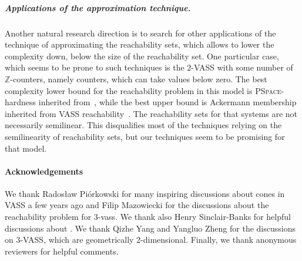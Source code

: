 \documentclass[a4paper, UKenglish, cleveref, autoref, thm-restate]{lipics-v2021}
\newcommand{\Z}{\mathbb{Z}}
\newcommand{\pspace}{\textsc{PSpace}\xspace}
\newcommand{\vass}{{\sc vass}\xspace}
\newcommand{\tvass}{\parvass 3}
\newcommand{\parvass}[1]{{$#1$-\vass}\xspace}
\newcommand{\para}[1]{\vspace{-3mm}\subparagraph*{\bf #1.}}
\begin{document}
\para{Applications of the approximation technique}
Another natural research direction is to search for other applications of the technique of approximating the reachability sets,
which allows to lower the complexity down, below the size of the reachability set.
One particular case, which seems to be prone to such techniques is the $2$-VASS with some number of $\Z$-counters, namely counters, which can take values below zero.
The best complexity lower bound for the reachability problem in this model is \pspace-hardness inherited from~\cite{BlondinFGHM15},
while the best upper bound is Ackermann membership inherited from VASS reachability~\cite{LS19}.
The reachability sets for that systems are not necessarily semilinear.
This disqualifies most of the techniques relying on the semilinearity of reachability sets, but our techniques
seem to be promising for that model.


 


\paragraph*{Acknowledgements}
We thank Radosław Piórkowski for many inspiring discussions about cones in VASS a few years ago
and Filip Mazowiecki for the discussions about the reachability problem for \tvass.
We thank also Henry Sinclair-Banks for helpful discussions about \cite[Thm 4.16]{DBLP:conf/focs/0001CMOSW24}.
We thank Qizhe Yang and Yangluo Zheng for the discussions on $3$-VASS, which are geometrically $2$-dimensional.
Finally, we thank anonymous reviewers for helpful comments.






\newpage


\appendix
\end{document}
